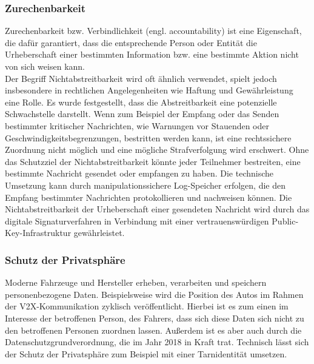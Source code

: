 \subsubsection{Zurechenbarkeit}
\glqq Zurechenbarkeit bzw. Verbindlichkeit (engl. accountability) ist eine Eigenschaft, die dafür garantiert, dass die entsprechende Person oder Entität die Urheberschaft einer bestimmten Information bzw. eine bestimmte Aktion nicht von sich weisen kann.
\grqq{} \cite[8]{Wurm.2022} \\
Der Begriff Nichtabstreitbarkeit wird oft ähnlich verwendet, spielt jedoch insbesondere in rechtlichen Angelegenheiten wie Haftung und Gewährleistung eine Rolle. Es wurde festgestellt, dass die Abstreitbarkeit eine potenzielle Schwachstelle darstellt. Wenn zum Beispiel der Empfang oder das Senden bestimmter kritischer Nachrichten, wie Warnungen vor Stauenden oder Geschwindigkeitsbegrenzungen, bestritten werden kann, ist eine rechtssichere Zuordnung nicht möglich und eine mögliche Strafverfolgung wird erschwert. Ohne das Schutzziel der Nichtabstreitbarkeit könnte jeder Teilnehmer bestreiten, eine bestimmte Nachricht gesendet oder empfangen zu haben. Die technische Umsetzung kann durch manipulationssichere Log-Speicher erfolgen, die den Empfang bestimmter Nachrichten protokollieren und nachweisen können. Die Nichtabstreitbarkeit der Urheberschaft einer gesendeten Nachricht wird durch das digitale Signaturverfahren in Verbindung mit einer vertrauenswürdigen Public-Key-Infrastruktur gewährleistet. \cite[8]{Wurm.2022}

\subsubsection{Schutz der Privatsphäre}
Moderne Fahrzeuge und Hersteller erheben, verarbeiten und speichern personenbezogene Daten. Beispielsweise wird die Position des Autos im Rahmen der \ac{V2X}-Kommunikation zyklisch veröffentlicht. Hierbei ist es zum einen im Interesse der betroffenen Person, des Fahrers, dass sich diese Daten sich nicht zu den betroffenen Personen zuordnen lassen. Außerdem ist es aber auch durch die Datenschutzgrundverordnung, die im Jahr 2018 in Kraft trat. Technisch lässt sich der Schutz der Privatsphäre zum Beispiel mit einer Tarnidentität umsetzen.


